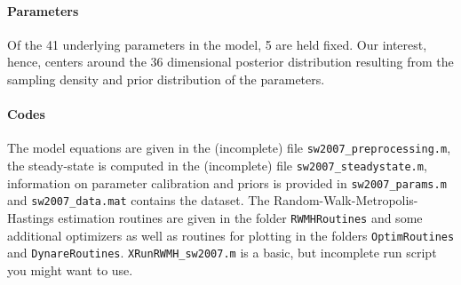 \documentclass{article}
\begin{document}
\paragraph{Parameters}
Of the 41 underlying parameters in the model, 5 are held fixed. Our interest, hence, centers around the 36 dimensional posterior distribution resulting from the sampling density and prior distribution of the parameters. 

\paragraph{Codes}
The model equations are given in the (incomplete) file \texttt{sw2007\_preprocessing.m}, the steady-state is computed in the (incomplete) file \texttt{sw2007\_steadystate.m}, information on parameter calibration and priors is provided in \texttt{sw2007\_params.m} and \texttt{sw2007\_data.mat} contains the dataset. The Random-Walk-Metropolis-Hastings estimation routines are given in the folder \texttt{RWMHRoutines} and some additional optimizers as well as routines for plotting in the folders \texttt{OptimRoutines} and \texttt{DynareRoutines}. \texttt{XRunRWMH\_sw2007.m} is a basic, but incomplete run script you might want to use.

\newpage
\end{document}
